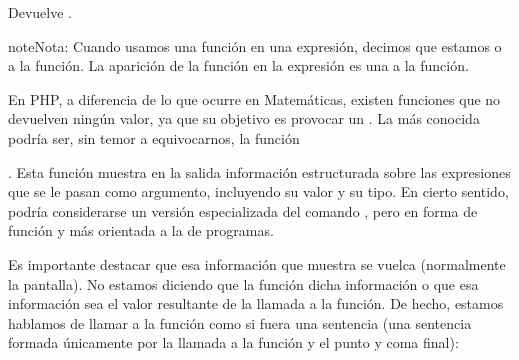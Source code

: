 \documentclass[a4paper,12pt,spanish]{sphinxmanual}
\begin{document}
\begin{sphinxVerbatim}[commandchars=\\\{\}]
   
\end{sphinxVerbatim}

Devuelve .

\begin{sphinxadmonition}{note}{Nota:}
Cuando usamos una función en una expresión, decimos que estamos  o
 a la función. La aparición de la función en la expresión es una
 a la función.
\end{sphinxadmonition}

\ignorespaces 
En PHP, a diferencia de lo que ocurre en Matemáticas, existen funciones que no
devuelven ningún valor, ya que su objetivo es provocar un . La
más conocida podría ser, sin temor a equivocarnos, la función %
\begin{footnote}[5]\sphinxAtStartFootnote
{}
%
\end{footnote}. Esta
función muestra en la salida información estructurada sobre las expresiones que
se le pasan como argumento, incluyendo su valor y su tipo. En cierto sentido,
podría considerarse un versión especializada del comando , pero en forma
de función y más orientada a la  de programas.

Es importante destacar que esa información que muestra se vuelca 
(normalmente la pantalla). No estamos diciendo que la función  dicha
información o que esa información sea el valor resultante de  la
llamada a la función. De hecho, estamos hablamos de llamar a la función como si
fuera una sentencia (una sentencia formada únicamente por la llamada a la
función y el punto y coma final):

\begin{sphinxVerbatim}[commandchars=\\\{\}]
  
\end{sphinxVerbatim}
\end{document}
